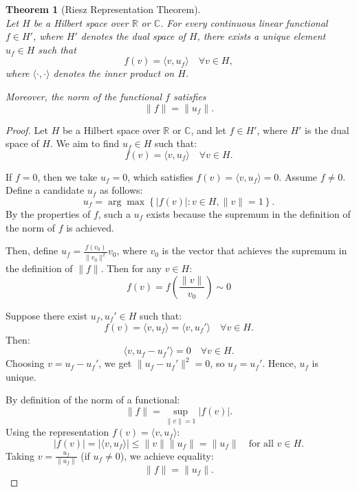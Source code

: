 \documentclass[12pt, reqno]{amsart}
\newtheorem{theorem}{Theorem}[section]
\theoremstyle{definition}
\numberwithin{equation}{section}
\newcommand{\dC}{{\mathbb C}}
\newcommand{\dR}{{\mathbb R}}
\begin{document}
\begin{theorem} [Riesz Representation Theorem] \hfill \\
Let $H$ be a Hilbert space over $\dR$ or $\dC$. For every continuous linear functional $f \in H'$, where $H'$ denotes the dual space of $H$, there exists a unique element $u_f \in H$ such that
\[
f(v) = \langle v, u_f \rangle \quad \forall v \in H,
\]
where $\langle \cdot, \cdot \rangle$ denotes the inner product on $H$.

Moreover, the norm of the functional $f$ satisfies
\[
\|f\| = \|u_f\|.
\]
\end{theorem}
\begin{proof}
Let \( H \) be a Hilbert space over \( \dR \) or \( \dC \), and let \( f \in H' \), where \( H' \) is the dual space of \( H \). We aim to find \( u_f \in H \) such that:
\[
f(v) = \langle v, u_f \rangle \quad \forall v \in H.
\]

If \( f = 0 \), then we take \( u_f = 0 \), which satisfies \( f(v) = \langle v, u_f \rangle = 0 \). Assume \( f \neq 0 \). Define a candidate \( u_f \) as follows:
\[
u_f = \arg \max \left\{ |f(v)| : v \in H, \|v\| = 1 \right\}.
\]
By the properties of \( f \), such a \( u_f \) exists because the supremum in the definition of the norm of \( f \) is achieved.

Then, define \( u_f = \frac{f(v_0)}{\|v_0\|^2} v_0 \), where \( v_0 \) is the vector that achieves the supremum in the definition of \( \|f\| \). Then for any \( v \in H \):
\[
f(v) = f\left( \frac{\|v\|}{v_0} \right) \sim 0
\]

Suppose there exist \( u_f, u_f' \in H \) such that:
\[
f(v) = \langle v, u_f \rangle = \langle v, u_f' \rangle \quad \forall v \in H.
\]
Then:
\[
\langle v, u_f - u_f' \rangle = 0 \quad \forall v \in H.
\]
Choosing \( v = u_f - u_f' \), we get \( \|u_f - u_f'\|^2 = 0 \), so \( u_f = u_f' \). Hence, \( u_f \) is unique.

By definition of the norm of a functional:
\[
\|f\| = \sup_{\|v\| = 1} |f(v)|.
\]
Using the representation \( f(v) = \langle v, u_f \rangle \):
\[
|f(v)| = |\langle v, u_f \rangle| \leq \|v\| \|u_f\| = \|u_f\| \quad \text{for all } v \in H.
\]
Taking \( v = \frac{u_f}{\|u_f\|} \) (if \( u_f \neq 0 \)), we achieve equality:
\[
\|f\| = \|u_f\|.
\]
\end{proof}
\end{document}
